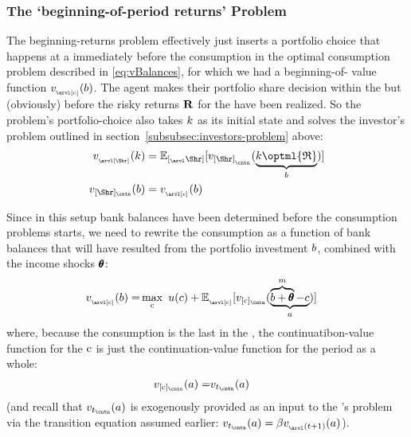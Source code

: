 \documentclass[\econtexRoot/SolvingMicroDSOPs]{subfiles}
\begin{document}
\hypertarget{beginning-returns}{}
\subsubsection{The `beginning-of-period returns' Problem}\label{subsubsec:beginning-returns}
The beginning-returns problem effectively just inserts a portfolio choice that happens at a {\stg} immediately before the consumption {\stg} in the optimal consumption problem described in \eqref{eq:vBalances}, for which we had a beginning-of-{\stg} value function $\vFunc_{_\arvl[\cFunc]}(\bNrm)$.  The agent makes their portfolio share decision within the {\stg} but (obviously) before the risky returns ${\mathbf{R}}$ for the {\interval} have been realized.  So the problem's portfolio-choice {\stg} also takes $k$ as its initial state and solves the investor's problem outlined in section~\ref{subsubsec:investors-problem} above:
\begin{equation}\begin{gathered}\begin{aligned}
  \vFunc_{_\arvl[\Shr]}(\kNrm) & = \Ex_{[_\arvl\Shr]}[\vFunc_{[\Shr]_{_\cntn}}(\underbrace{\kNrm\optml{\Rport}}_{\bNrm})]
\\\vFunc_{[\Shr]_\cntn}(\bNrm)  & = \vFunc_{_\arvl[\cFunc]}(\bNrm)
    \end{aligned}\end{gathered}\end{equation}

Since in this setup bank balances have been determined before the consumption problems starts, we need to rewrite the consumption {\stg}  as a function of bank balances that will have resulted from the portfolio investment $b$, combined with the income shocks $\pmb{\theta}$:
\begin{equation}\begin{gathered}\begin{aligned}
      \vFunc_{_\arvl[\cFunc]}(\bNrm) = & \max_{\cFunc}~ \uFunc(\cNrm) + \Ex_{_\arvl[\cFunc]}[\vFunc_{[\cFunc]_\cntn}(\underbrace{\overbrace{\bNrm+\TranShkEmp}^{\mNrm}-\cNrm}_{\aNrm})]
    \end{aligned}\end{gathered}\end{equation}
where, because the consumption {\stg} is the last {\stg} in the {\interval}, the continuatibon-value function for the $\mathrm{c}$ {\stg} is just the continuation-value function for the period as a whole:
\begin{equation}\begin{gathered}\begin{aligned}
      \vFunc_{[\cFunc]_\cntn}(\aNrm) = & \vFunc_{\prd_\cntn}(\aNrm)
    \end{aligned}\end{gathered}\end{equation}
(and recall that $\vFunc_{\prd_\cntn}(\aNrm)$ is exogenously provided as an input to the {\interval}'s problem via the transition equation assumed earlier: $\vFunc_{\prd_\cntn}(\aNrm)=\DiscFac \vFunc_{_\arvl(\prd+1)}(a)$).
\end{document}
